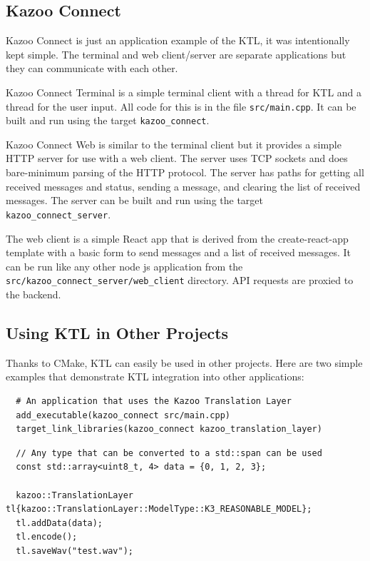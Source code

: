 \documentclass[]{article}
\begin{document}
\subsection{Kazoo Connect}

Kazoo Connect is just an application example of the KTL, it was intentionally kept simple. The terminal and web client/server are separate applications but they can communicate with each other.


Kazoo Connect Terminal is a simple terminal client with a thread for KTL and a thread for the user input. All code for this is in the file \texttt{src/main.cpp}. It can be built and run using the target \texttt{kazoo\_connect}.


Kazoo Connect Web is similar to the terminal client but it provides a simple HTTP server for use with a web client. The server uses TCP sockets and does bare-minimum parsing of the HTTP protocol. The server has paths for getting all received messages and status, sending a message, and clearing the list of received messages. The server can be built and run using the target \texttt{kazoo\_connect\_server}.

The web client is a simple React app that is derived from the create-react-app template with a basic form to send messages and a list of received messages. It can be run like any other node js application from the \texttt{src/kazoo\_connect\_server/web\_client} directory. API requests are proxied to the backend.


\subsection{Using KTL in Other Projects}

Thanks to CMake, KTL can easily be used in other projects. Here are two simple examples that demonstrate KTL integration into other applications:

\begin{verbatim}
  # An application that uses the Kazoo Translation Layer
  add_executable(kazoo_connect src/main.cpp)
  target_link_libraries(kazoo_connect kazoo_translation_layer)
\end{verbatim}


\begin{verbatim}
  // Any type that can be converted to a std::span can be used
  const std::array<uint8_t, 4> data = {0, 1, 2, 3};

  kazoo::TranslationLayer tl{kazoo::TranslationLayer::ModelType::K3_REASONABLE_MODEL};
  tl.addData(data);
  tl.encode();
  tl.saveWav("test.wav");
\end{verbatim}
\end{document}
